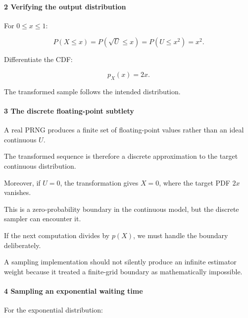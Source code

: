 \paragraph{2 Verifying the output distribution}\label{02-foundations-ii-ch029-verifying-the-output-distribution}

\hypertarget{02-foundations-ii-ch029-verifying-the-output-distribution}{}

For \(0\le x\le1\):

\[
 P(X\le x) = P(\sqrt U\le x) = P(U\le x^2) =x^2.
\]

Differentiate the CDF:

\[
 p_X(x)=2x.
\]

The transformed sample follows the intended distribution.

\paragraph{3 The discrete floating-point subtlety}\label{02-foundations-ii-ch029-the-discrete-floating-point-subtlety}

\hypertarget{02-foundations-ii-ch029-the-discrete-floating-point-subtlety}{}

A real PRNG produces a finite set of floating-point values rather than an ideal continuous \(U\).

The transformed sequence is therefore a discrete approximation to the target continuous distribution.

Moreover, if \(U=0\), the transformation gives \(X=0\), where the target PDF \(2x\) vanishes.

This is a zero-probability boundary in the continuous model, but the discrete sampler can encounter it.

If the next computation divides by \(p(X)\), we must handle the boundary deliberately.

A sampling implementation should not silently produce an infinite estimator weight because it treated a finite-grid boundary as mathematically impossible.

\paragraph{4 Sampling an exponential waiting time}\label{02-foundations-ii-ch029-sampling-an-exponential-waiting-time}

\hypertarget{02-foundations-ii-ch029-sampling-an-exponential-waiting-time}{}

For the exponential distribution:

